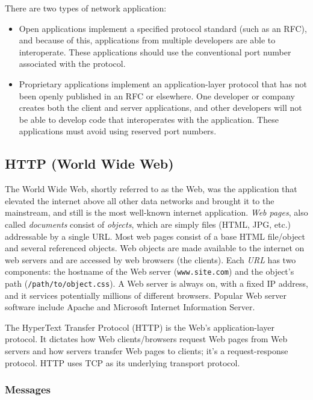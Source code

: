 \documentclass[table, xcdraw]{article}%
\begin{document}
There are two types of network application:

\begin{itemize}
 \item Open applications implement a specified protocol standard (such as an RFC), and because of this, applications from multiple developers are able to interoperate. These applications should use the conventional port number associated with the protocol.
 \item Proprietary applications implement an application-layer protocol that has not been openly published in an RFC or elsewhere. One developer or company creates both the client and server applications, and other developers will not be able to develop code that interoperates with the application. These applications must avoid using reserved port numbers.
\end{itemize}

\subsection{HTTP (World Wide Web)} \label{HTTP}

The World Wide Web, shortly referred to as the Web, was the application that elevated the internet above all other data networks and brought it to the mainstream, and still is the most well-known internet application. \emph{Web pages}, also called \emph{documents} consist of \emph{objects}, which are simply files (HTML, JPG, etc.) addressable by a single URL. Most web pages consist of a base HTML file/object and several referenced objects. Web objects are made available to the internet on web servers and are accessed by web browsers (the clients). Each \emph{URL} has two components: the hostname of the Web server (\texttt{www.site.com}) and the object’s path (\texttt{/path/to/object.css}). A Web server is always on, with a fixed IP address, and it services potentially millions of different browsers. Popular Web server software include Apache and Microsoft Internet Information Server.

The HyperText Transfer Protocol (HTTP) is the Web’s application-layer protocol. It dictates how Web clients/browsers request Web pages from Web servers and how servers transfer Web pages to clients; it's a request-response protocol. HTTP uses TCP as its underlying transport protocol.

\subsubsection{Messages}
\end{document}
